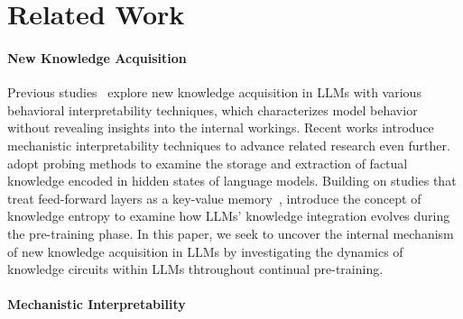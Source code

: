 \section{Related Work}

\paragraph{New Knowledge Acquisition}

Previous studies~\citep{acquire_factual_knowledge} explore new knowledge acquisition in LLMs with various behavioral interpretability techniques, which characterizes model behavior without revealing insights into the internal workings.
Recent works introduce mechanistic interpretability techniques to advance related research even further.
\citet{physics3.1} adopt probing methods to examine the storage and extraction of factual knowledge encoded in hidden states of language models.
Building on studies that treat feed-forward layers as a key-value memory~\citep{ffn_kv,knowledge_neurons}, \citet{knowledge_entropy} introduce the concept of knowledge entropy to examine how LLMs' knowledge integration evolves during the pre-training phase.
In this paper, we seek to uncover the internal mechanism of new knowledge acquisition in LLMs by investigating the dynamics of knowledge circuits within LLMs thtroughout continual pre-training.

\paragraph{Mechanistic Interpretability}

